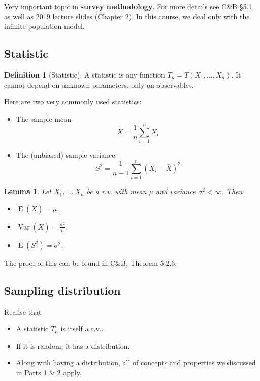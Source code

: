 \documentclass[
]{book}
\providecommand{\tightlist}{%
  \setlength{\itemsep}{0pt}\setlength{\parskip}{0pt}}
\DeclareMathOperator{\E}{E}
\DeclareMathOperator{\Var}{Var}
\newtheorem{lemma}{Lemma}[chapter]
\theoremstyle{definition}
\newtheorem{definition}{Definition}[chapter]
\theoremstyle{definition}
\theoremstyle{definition}
\theoremstyle{definition}
\theoremstyle{remark}
\begin{document}
Very important topic in \textbf{survey methodology}.
For more details see C\&B §5.1, as well as 2019 lecture slides (Chapter 2).
In this course, we deal only with the infinite population model.

\hypertarget{statistic}{%
\subsection{Statistic}\label{statistic}}

\begin{definition}[Statistic]
A statistic is any function \(T_n = T(X_1,\dots,X_n)\). It cannot depend on unknown parameters, only on observables.
\end{definition}

Here are two very commonly used statistics:

\begin{itemize}
\item
  The sample mean
  \[
  \bar X = \frac{1}{n}\sum_{i=1}^n X_i
  \]
\item
  The (unbiased) sample variance
  \[
  S^2 = \frac{1}{n-1}\sum_{i=1}^n (X_i-\bar X)^2
  \]
\end{itemize}

\begin{lemma}

Let \(X_1,\dots,X_n\) be a r.v. with mean \(\mu\) and variance \(\sigma^2<\infty\). Then

\begin{itemize}
\tightlist
\item
  \(\E(\bar X) = \mu\).
\item
  \(\Var(\bar X) = \frac{\sigma^2}{n}\).
\item
  \(\E(S^2)=\sigma^2\).
\end{itemize}

\end{lemma}

The proof of this can be found in C\&B, Theorem 5.2.6.

\hypertarget{sampling-distribution}{%
\subsection{Sampling distribution}\label{sampling-distribution}}

Realise that

\begin{itemize}
\tightlist
\item
  A statistic \(T_n\) is itself a r.v..
\item
  If it is random, it has a distribution.
\item
  Along with having a distribution, all of concepts and properties we discussed in Parts 1 \& 2 apply.
\end{itemize}
\end{document}
